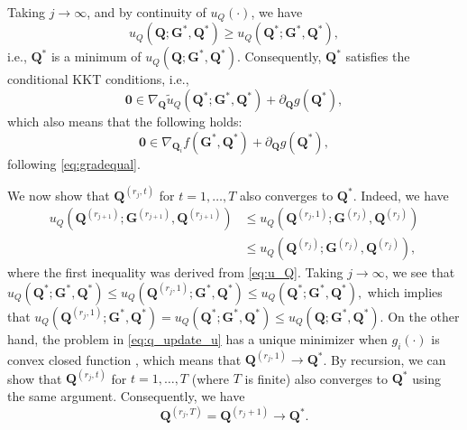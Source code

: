 \documentclass[10pt,journal]{IEEEtran}
\newcommand{\G}{\boldsymbol{G}}
\newcommand{\Q}{\boldsymbol{Q}}
\begin{document}
Taking $j\rightarrow \infty$, and by continuity of $u_Q(\cdot)$, we have
\begin{equation}
	    u_Q({\bm Q};{\bm G}^{\ast},{\bm Q}^\ast) \geq  u_Q({\bm Q}^\ast;{\bm G}^{\ast},{\bm Q}^\ast),
\end{equation}
i.e., ${\bm Q}^{\ast}$ is a minimum of $u_Q({\bm Q};{\bm G}^{\ast},{\bm Q}^\ast)$.
Consequently, ${\bm Q}^{\ast}$ satisfies the conditional KKT conditions, i.e.,
\begin{equation}
	 {\bm 0} \in  \nabla_{{\bm Q}} \tilde{u}_Q({\bm Q}^\ast;{\bm G}^{\ast},{\bm Q}^\ast) + \partial_{\Q}g(\Q^\ast),
\end{equation}
which also means that the following holds:
\begin{equation}\label{eq:QKKT}
	     {\bm 0} \in \nabla_{{\bm Q}_i} f({\bm G}^{\ast},{\bm Q}^\ast) + \partial_{\Q}g(\Q^\ast) ,
\end{equation}
following \eqref{eq:gradequal}.

We now show that $\Q^{(r_j,t)}$ for $t=1,\ldots,T$ also converges to $\Q^\ast$.
Indeed, we have
\begin{align*}
u_Q(\Q^{(r_{j+1})};\G^{(r_{j+1})},\Q^{(r_{j+1})})&\leq u_Q(\Q^{(r_j,1)};\G^{(r_j)},\Q^{(r_j)})\\
&\leq u_Q(\Q^{(r_j)};\G^{(r_j)},\Q^{(r_j)}) ,
\end{align*}
where the first inequality was derived from \eqref{eq:u_Q}.
Taking $j\rightarrow \infty$, we see that
$ u_Q(\Q^{\ast};\G^{\ast},\Q^{\ast})\leq u_Q(\Q^{(r_j,1)};\G^{\ast},\Q^{\ast})\leq u_Q(\Q^{\ast};\G^{\ast},\Q^{\ast}) , $
which implies that
$u_Q(\Q^{(r_j,1)};\G^{\ast},\Q^{\ast})= u_Q(\Q^{\ast};\G^{\ast},\Q^{\ast})\leq u_Q(\Q;\G^{\ast},\Q^{\ast}).$
On the other hand, the problem in \eqref{eq:q_update_u} has a unique minimizer when $g_i(\cdot)$ is convex closed function \cite{parikh2013proximal},
which means that $\Q^{(r_j,1)}\rightarrow \Q^{\ast}$. By recursion, we can show that
$\Q^{(r_j,t)}$ for $t=1,\ldots,T$ (where $T$ is finite) also converges to $\Q^\ast$ using the same argument.
Consequently, we have
\begin{equation}\label{eq:q_rj+1}
\Q^{(r_j,T)} = \Q^{(r_j+1)} \rightarrow \Q^\ast. 
\end{equation}
\end{document}
